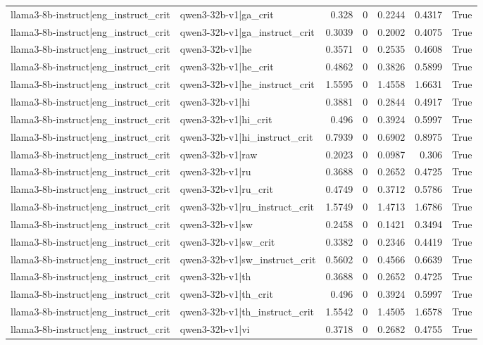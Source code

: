 \begin{table}
\begin{tabular}{l l r r r r l}
llama3-8b-instruct|eng_instruct_crit & qwen3-32b-v1|ga_crit & 0.328 & 0 & 0.2244 & 0.4317 & True \\
llama3-8b-instruct|eng_instruct_crit & qwen3-32b-v1|ga_instruct_crit & 0.3039 & 0 & 0.2002 & 0.4075 & True \\
llama3-8b-instruct|eng_instruct_crit & qwen3-32b-v1|he & 0.3571 & 0 & 0.2535 & 0.4608 & True \\
llama3-8b-instruct|eng_instruct_crit & qwen3-32b-v1|he_crit & 0.4862 & 0 & 0.3826 & 0.5899 & True \\
llama3-8b-instruct|eng_instruct_crit & qwen3-32b-v1|he_instruct_crit & 1.5595 & 0 & 1.4558 & 1.6631 & True \\
llama3-8b-instruct|eng_instruct_crit & qwen3-32b-v1|hi & 0.3881 & 0 & 0.2844 & 0.4917 & True \\
llama3-8b-instruct|eng_instruct_crit & qwen3-32b-v1|hi_crit & 0.496 & 0 & 0.3924 & 0.5997 & True \\
llama3-8b-instruct|eng_instruct_crit & qwen3-32b-v1|hi_instruct_crit & 0.7939 & 0 & 0.6902 & 0.8975 & True \\
llama3-8b-instruct|eng_instruct_crit & qwen3-32b-v1|raw & 0.2023 & 0 & 0.0987 & 0.306 & True \\
llama3-8b-instruct|eng_instruct_crit & qwen3-32b-v1|ru & 0.3688 & 0 & 0.2652 & 0.4725 & True \\
llama3-8b-instruct|eng_instruct_crit & qwen3-32b-v1|ru_crit & 0.4749 & 0 & 0.3712 & 0.5786 & True \\
llama3-8b-instruct|eng_instruct_crit & qwen3-32b-v1|ru_instruct_crit & 1.5749 & 0 & 1.4713 & 1.6786 & True \\
llama3-8b-instruct|eng_instruct_crit & qwen3-32b-v1|sw & 0.2458 & 0 & 0.1421 & 0.3494 & True \\
llama3-8b-instruct|eng_instruct_crit & qwen3-32b-v1|sw_crit & 0.3382 & 0 & 0.2346 & 0.4419 & True \\
llama3-8b-instruct|eng_instruct_crit & qwen3-32b-v1|sw_instruct_crit & 0.5602 & 0 & 0.4566 & 0.6639 & True \\
llama3-8b-instruct|eng_instruct_crit & qwen3-32b-v1|th & 0.3688 & 0 & 0.2652 & 0.4725 & True \\
llama3-8b-instruct|eng_instruct_crit & qwen3-32b-v1|th_crit & 0.496 & 0 & 0.3924 & 0.5997 & True \\
llama3-8b-instruct|eng_instruct_crit & qwen3-32b-v1|th_instruct_crit & 1.5542 & 0 & 1.4505 & 1.6578 & True \\
llama3-8b-instruct|eng_instruct_crit & qwen3-32b-v1|vi & 0.3718 & 0 & 0.2682 & 0.4755 & True \\

\end{tabular}
\end{table}
